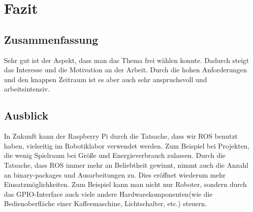 \documentclass[12pt]{article}
\begin{document}













\section{Fazit}
\subsection{Zusammenfassung}

Sehr gut ist der Aspekt, dass man das Thema frei wählen konnte. Dadurch steigt das Interesse und die Motivation an der Arbeit. Durch die hohen Anforderungen und den knappen Zeitraum ist es aber auch sehr anspruchsvoll und arbeitsintensiv. 


\subsection{Ausblick}

In Zukunft kann der Raspberry Pi durch die Tatsache, dass wir ROS benutzt haben, vielseitig im Robotiklabor verwendet werden. Zum Beispiel bei Projekten, die wenig Spielraum bei Größe und Energieverbrauch zulassen.
Durch die Tatsache, dass ROS immer mehr an Beliebtheit gewinnt, nimmt auch die Anzahl an binary-packages und Ausarbeitungen zu. Dies eröffnet wiederum mehr Einsatzmöglichkeiten.
Zum Beispiel kann man nicht nur Roboter, sondern durch das GPIO-Interface auch viele andere Hardwarekomponenten(wie die Bedienoberfläche einer Kaffeemaschine, Lichtschalter, etc.) steuern.  

\end{document}
